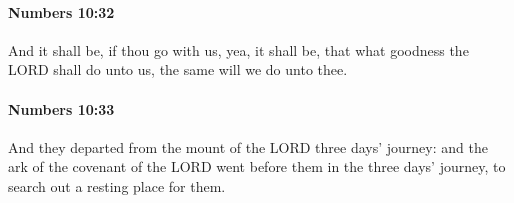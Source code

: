 		\paragraph{Numbers 10:32} %
			\label{NUMBERS-10-32}

			And it shall be, if thou go with us, yea, it shall be, that what goodness the LORD shall do unto us, the same will we do unto thee.


		\paragraph{Numbers 10:33} %
			\label{NUMBERS-10-33}

			And they departed from the mount of the LORD three days’ journey: and the ark of the covenant of the LORD went before them in the three days’ journey, to search out a resting place for them.


